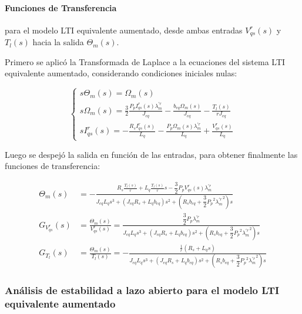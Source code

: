 \documentclass[a4paper, 10pt, onecolumn,journal]{ieeeconf}
\begin{document}
\paragraph{\textbf{Funciones de Transferencia}}
para el modelo LTI equivalente aumentado, desde ambas entradas $V^r_{qs}(s)$ y $T_l(s)$ hacia la salida ${\Theta}_m(s)$.

Primero se aplicó la Transformada de Laplace a la ecuaciones del sistema LTI equivalente aumentado, considerando condiciones iniciales nulas:

\begin{equation}
	\begin{cases}
		s{\Theta}_m(s) = {\Omega}_m(s)\\
		s{\Omega}_m(s) = \frac{3}{2} \frac{P_p I^r_{qs}(s)\lambda^{'r}_m}{J_{eq}} - \frac{b_{eq}\Omega_m(s)}{J_{eq}} - \frac{T_l(s)}{r J_{eq}}\\
		s{I}^r_{qs}(s) = -\frac{R_s I^r_{qs}(s)}{L_q} - \frac{P_p \Omega_m(s) \lambda^{'r}_m}{L_q}+ \frac{V^r_{qs}(s)}{L_q}	
	\end{cases}
	\label{equaciones modelo LTI eq en s}
\end{equation}

Luego se despejó la salida en función de las entradas, para obtener finalmente las funciones de transferencia:

\begin{align}
	{\Theta}_m(s) &= -\frac{R_{s} \frac{T_l(s)}{r} + L_{q} \frac{T_l(s)}{r} s - \dfrac{3}{2} P_{p} V^r_{qs}(s) \lambda^{'r}_m}{J_{eq} L_{q} s^3 +\left( J_{eq} R_{s} + L_{q} b_{eq} \right)s^2 + \left( R_{s} b_{eq} + \dfrac{3}{2} {P_{p}}^2 { \lambda^{'r}_m}^2\right) s}\label{posicion en funcion de demas variables en laplace}\\
	G_{V^r_{qs}}(s) &= \frac{{\Theta}_m(s)}{V^r_{qs}(s)} = \frac{\dfrac{3}{2} P_{p} \lambda^{'r}_m}{J_{eq} L_{q} s^3 +\left( J_{eq} R_{s} + L_{q} b_{eq} \right)s^2 + \left( R_{s} b_{eq} + \dfrac{3}{2} {P_{p}}^2 { \lambda^{'r}_m}^2\right) s}\label{funcion de transferencia desde Vqs}\\
	G_{T_l}(s) &= \frac{{\Theta}_m(s)}{T_l(s)} = -\frac{\frac{1}{r}\left( R_{s} + L_{q} s\right) }{J_{eq} L_{q} s^3 +\left( J_{eq} R_{s} + L_{q} b_{eq} \right)s^2 + \left( R_{s} b_{eq} + \dfrac{3}{2} {P_{p}}^2 { \lambda^{'r}_m}^2\right) s}
	\label{funcion de transferencia desde T_l}
\end{align}

\subsubsection{\textbf{Análisis de estabilidad a lazo abierto para el modelo LTI equivalente aumentado}}
\end{document}
